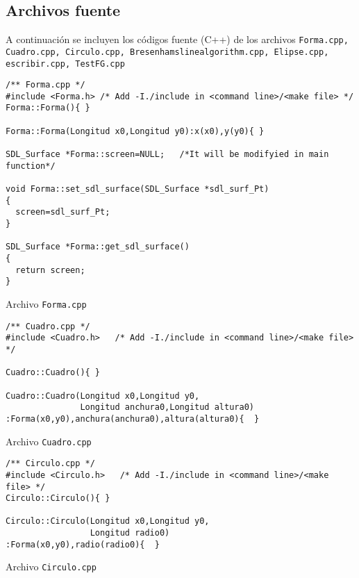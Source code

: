 \documentclass[11pt]{article}
\begin{document}
\subsection*{Archivos fuente}
A continuaci\'{o}n se incluyen los c\'{o}digos fuente (C++) de los archivos 
{\tt Forma.cpp, Cuadro.cpp, Circulo.cpp, Bresenhamslinealgorithm.cpp, 
Elipse.cpp, escribir.cpp, TestFG.cpp}
\begin{verbatim}
/** Forma.cpp */
#include <Forma.h> /* Add -I./include in <command line>/<make file> */
Forma::Forma(){ }

Forma::Forma(Longitud x0,Longitud y0):x(x0),y(y0){ }

SDL_Surface *Forma::screen=NULL;   /*It will be modifyied in main function*/

void Forma::set_sdl_surface(SDL_Surface *sdl_surf_Pt)
{
  screen=sdl_surf_Pt;
}

SDL_Surface *Forma::get_sdl_surface()
{
  return screen;
}
\end{verbatim}
\begin{center}
Archivo {\tt Forma.cpp}
\end{center}
\begin{verbatim}
/** Cuadro.cpp */
#include <Cuadro.h>   /* Add -I./include in <command line>/<make file> */

Cuadro::Cuadro(){ }

Cuadro::Cuadro(Longitud x0,Longitud y0,
               Longitud anchura0,Longitud altura0)
:Forma(x0,y0),anchura(anchura0),altura(altura0){  }
\end{verbatim}
\begin{center}
Archivo {\tt Cuadro.cpp}
\end{center}
\begin{verbatim}
/** Circulo.cpp */
#include <Circulo.h>   /* Add -I./include in <command line>/<make file> */
Circulo::Circulo(){ }

Circulo::Circulo(Longitud x0,Longitud y0,
                 Longitud radio0)
:Forma(x0,y0),radio(radio0){  }
\end{verbatim}
\begin{center}
Archivo {\tt Circulo.cpp}
\end{center}
\end{document}
